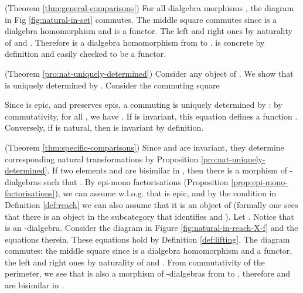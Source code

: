\documentclass[orivec]{llncs}
\newcommand{\obj}[3]{\node (#1) [#2] {};}
\newcommand{\arr}[3]{\path[->,font=\scriptsize](#2) edge node[auto] {} (#3);}
\newcommand{\mF}[1]{\mathtt{#1}}
\newcommand{\F}{\mF{F}}
\newcommand{\G}{\mF{G}}
\newcommand{\id}{\mathit{id}}
\newcommand{\proend}{\medskip}
\renewenvironment{proof}{\begin{pro}}{\proend\end{pro}}
\begin{document}
\begin{proof}(Theorem \ref{thm:general-comparisons})
	For all dialgebra morphisms , the diagram in Fig \ref{fig:natural-in-set} commutes. The middle square commutes since  is a dialgebra homomorphism and  is a functor. The left and right ones by naturality of  and . Therefore  is a dialgebra homomorphism from  to .  is concrete by definition and easily checked to be a functor.
\end{proof}

\begin{proof}(Theorem \ref{pro:nat-uniquely-determined})
Consider any object  of . We show that  is uniquely determined by . 
	Consider the commuting square
	\begin{center}
	\end{center} 
Since  is epic, and  preserves epis, a commuting  is uniquely determined by : by commutativity, for all , we have .  If  is invariant, this equation defines a function . Conversely, if  is natural, then  is invariant by definition.
\end{proof}

\begin{proof}(Theorem \ref{thm:specific-comparisons})
Since  and  are invariant, they determine corresponding natural transformations by Proposition \ref{pro:nat-uniquely-determined}. If two elements  and  are bisimilar in , then there is a morphism of -dialgebras  such that . By epi-mono factorisations (Proposition \ref{prop:epi-mono-factorisations}), we can assume w.l.o.g. that  is epic, and by the condition in Definition \ref{def:reach} we can also assume that it is an object of  (formally one sees that there is an object in the subcategory that identifies  and ). Let . Notice that  is an -dialgebra. Consider the diagram in Figure \ref{fig:natural-in-reach-X-f} and the equations therein. These equations hold by Definition \ref{def:lifting}.  The diagram commutes: the middle square since  is a dialgebra homomorphism and  a functor, the left and right ones by naturality of  and . From commutativity of the perimeter, we see that  is also a morphism of -dialgebras from  to , therefore  and  are bisimilar in .
\end{proof}
\end{document}
